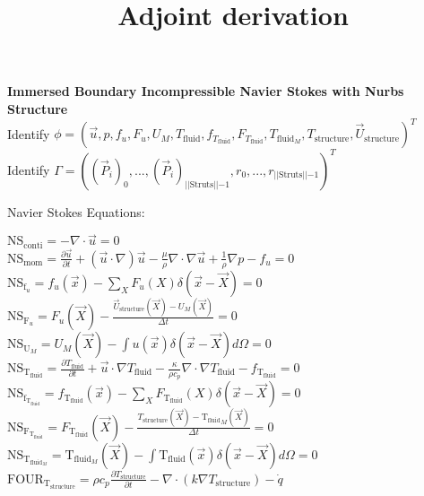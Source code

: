 \documentclass[10pt]{article} %
\title{Adjoint derivation}
\date{}
\begin{document}
\maketitle
\begin{center}
	\textbf{ Immersed Boundary Incompressible Navier Stokes with Nurbs Structure}\\
	Identify $\phi= \left(\vec{u},p,f_u,F_u,U_M,T_{\text{fluid}},f_{T_{\text{fluid}}},F_{T_{\text{fluid}}},T_{\text{fluid}_M},T_{\text{structure}},\vec{U}_\text{structure}\right)^T$\\
	Identify $\Gamma= \left((\vec{P}_{i})_0,...,(\vec{P}_{i})_{\lvert\lvert \text{Struts}\lvert\lvert-1},r_0,...,r_{\lvert\lvert \text{Struts}\lvert\lvert-1} \right)^T$\\
\begin{flushleft}
	Navier Stokes Equations:
\end{flushleft}
	$ \text{NS}_{\text{conti}} =- \nabla \cdot \vec{u} = 0$\\
	$ \text{NS}_{\text{mom}} = \frac{\partial \vec{u}}{\partial t} + (\vec{u} \cdot \nabla) \vec{u} - \frac{\mu}{\rho} \nabla \cdot \nabla \vec{u} + \frac{1}{\rho} \nabla p - f_u = 0$\\
	$\text{NS}_{\text{f}_u} = f_u (\vec{x}) - \sum_{X} F_u (X) \delta (\vec{x}-\vec{X}) = 0$\\
	$\text{NS}_{\text{F}_u} = F_u (\vec{X}) - \frac{\vec{U}_\text{structure} (\vec{X}) - U_M(\vec{X})}{\Delta t} = 0$\\
	$\text{NS}_{\text{U}_M} = U_M (\vec{X}) - \int u(\vec{x}) \delta(\vec{x}-\vec{X}) d \Omega= 0$\\
	$\text{NS}_{\text{T}_{\text{fluid}}} = \frac{\partial T_{\text{fluid}}}{\partial t} + \vec{u} \cdot \nabla T_{\text{fluid}} - \frac{\kappa}{\rho c_p} \nabla \cdot \nabla T_{\text{fluid}} - f_{\text{T}_{\text{fluid}}} = 0$\\
	$\text{NS}_{\text{f}_{\text{T}_{\text{fluid}}}} = f_{\text{T}_{\text{fluid}}} (\vec{x}) - \sum_{X} F_{\text{T}_{\text{fluid}}} (X) \delta (\vec{x}-\vec{X}) = 0$\\
	$\text{NS}_{\text{F}_{\text{T}_{\text{fluid}}}} = F_{\text{T}_{\text{fluid}}} (\vec{X}) - \frac{T_{\text{structure}} (\vec{X}) - {\text{T}_{\text{fluid}}}_M(\vec{X})}{\Delta t} = 0$\\
	$\text{NS}_{\text{T}_{\text{fluid}_M}} = \text{T}_{\text{fluid}_M} (\vec{X}) - \int {\text{T}_{\text{fluid}}}(\vec{x}) \delta(\vec{x}-\vec{X}) d \Omega= 0$\\
	$\text{FOUR}_{\text{T}_{\text{structure}}} = \rho c_p \frac{\partial T_{\text{structure}}}{\partial t} - \nabla \cdot (k\nabla T_{\text{structure}}) - \dot q$\\

\end{center}
\end{document}
